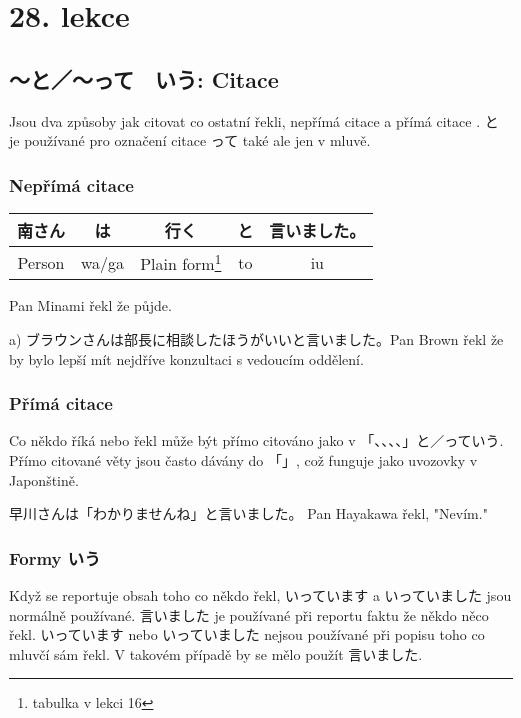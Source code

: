 \section{28. lekce}
\label{sec:lekce_28}
\subsection{〜と／〜って　いう: Citace}

Jsou dva způsoby jak citovat co ostatní řekli, nepřímá citace a přímá citace . と je používané pro označení citace って také ale jen v mluvě.

\subsubsection{Nepřímá citace}

\begin{center}
\begin{tabular}{|| c | c || c | c || c ||}
南さん&は&行く&と&言いました。 \\
\hline
Person & wa/ga & Plain form\footnote{tabulka v lekci 16} & to & iu \\
\hline
\end{tabular}
\end{center}

Pan Minami řekl že půjde.


a) ブラウンさんは部長に相談したほうがいいと言いました。Pan Brown řekl že by bylo lepší mít nejdříve konzultaci s vedoucím oddělení.


\subsubsection{Přímá citace}

Co někdo říká nebo řekl může být přímo citováno jako v  「、、、、」と／っていう. Přímo citované věty jsou často dávány do  「」, což funguje jako uvozovky v Japonštině.

早川さんは「わかりませんね」と言いました。 Pan Hayakawa řekl, "Nevím." 


\subsubsection{Formy いう}

Když se reportuje obsah toho co někdo řekl,  いっています a いっていました jsou normálně používané. 言いました je používané při reportu faktu že někdo něco řekl. いっています nebo いっていました nejsou používané při popisu toho co mluvčí sám řekl. V takovém případě by se mělo použít 言いました.

